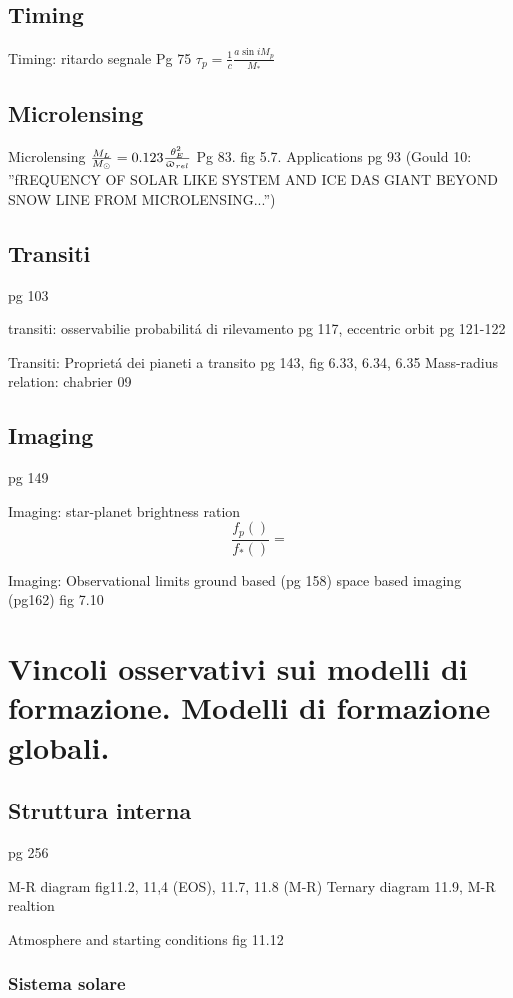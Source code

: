 \section{Timing}
\begin{workout}{Timing: ritardo segnale}
Pg 75
$\tau_p=\frac{1}{c}\frac{a\sin{i}M_p}{M_*}$
\end{workout}
\section{Microlensing}
\begin{workout}{Microlensing}
$\frac{M_L}{M_{\odot}{}}=0.123\frac{\theta_E^2}{\upvarpi_{rel}}$
Pg 83. fig 5.7. Applications pg 93
(Gould 10: ''fREQUENCY OF SOLAR LIKE SYSTEM AND ICE DAS GIANT BEYOND SNOW LINE FROM MICROLENSING...'')
\end{workout}
\section{Transiti}
pg 103
\begin{workout}{transiti: osservabilie probabilit\'a di rilevamento}
pg 117, eccentric orbit pg 121-122
\end{workout}
\begin{workout}{Transiti: Propriet\'a dei pianeti a transito}
pg 143, fig 6.33, 6.34, 6.35
Mass-radius relation: chabrier 09
\end{workout}

\section{Imaging}
pg 149
\begin{workout}{Imaging: star-planet brightness ration}
\begin{equation*}
\frac{f_p()}{f_*()}=
\end{equation*}
\end{workout}
\begin{workout}{Imaging: Observational limits}
ground based (pg 158) space based imaging (pg162)
fig 7.10
\end{workout}

\chapter{Vincoli osservativi sui modelli di formazione. Modelli di formazione globali.}

\section{Struttura interna}

pg 256 
\begin{workout}{M-R diagram}
fig11.2, 11,4 (EOS), 11.7, 11.8 (M-R)
Ternary diagram 11.9, M-R realtion
\end{workout}

\begin{workout}{Atmosphere and starting conditions}
fig 11.12
\end{workout}

\subsection{Sistema solare}

